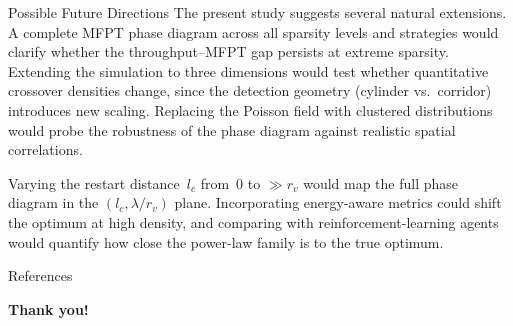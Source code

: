 \documentclass[aspectratio=169,xcolor=dvipsnames]{beamer}
\begin{document}
\begin{frame}{Possible Future Directions}
The present study suggests several natural extensions. A complete MFPT phase diagram across all sparsity levels and strategies would clarify whether the throughput--MFPT gap persists at extreme sparsity. Extending the simulation to three dimensions would test whether quantitative crossover densities change, since the detection geometry (cylinder vs.\ corridor) introduces new scaling. Replacing the Poisson field with clustered distributions would probe the robustness of the phase diagram against realistic spatial correlations.

\vspace{6pt}
Varying the restart distance~$l_c$ from~$0$ to $\gg r_v$ would map the full phase diagram in the $(l_c, \lambda/r_v)$ plane. Incorporating energy-aware metrics could shift the optimum at high density, and comparing with reinforcement-learning agents~\cite{munozgil2023optimal} would quantify how close the power-law family is to the true optimum.
\end{frame}


\begin{frame}{References}
    \nocite{viswanathan1999optimizing}
    \nocite{edwards2007revisiting}

    \nocite{bartumeus2002optimizing}
    \nocite{raposo2003dynamical}
    \nocite{benichou2011intermittent}

    \nocite{palyulin2014levy}
    \nocite{levernier2020inverse}
    \nocite{buldyrev2021comment}

    \nocite{wosniack2017evolutionary}
    \nocite{humphries2012foraging}

    \nocite{munozgil2023optimal}
    \nocite{kaur2023adaptive}

    \tiny
    
    
\end{frame}


\begin{frame}
    \LARGE{\centerline{\textbf{Thank you!}}}
\end{frame}

\appendix
\end{document}
